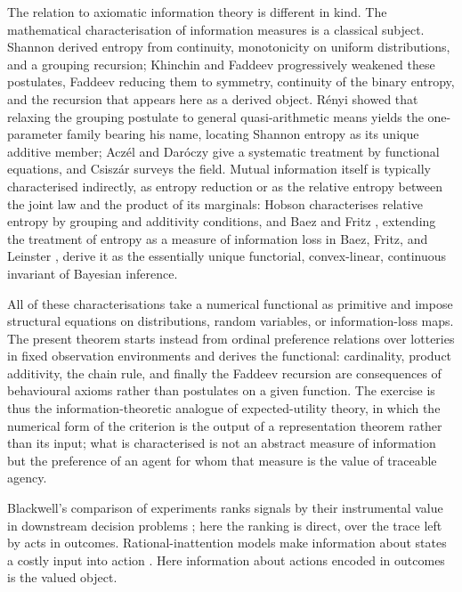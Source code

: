 \documentclass[11pt,a4paper]{article}
\theoremstyle{definition}
\newcommand{\1}{\mathbf 1}
\begin{document}
The relation to axiomatic information theory is different in kind.  The mathematical characterisation of information
measures is a classical subject.  Shannon \cite{Shannon1948} derived entropy from continuity, monotonicity on uniform
distributions, and a grouping recursion; Khinchin \cite{Khinchin1957} and Faddeev \cite{Faddeev1956} progressively
weakened these postulates, Faddeev reducing them to symmetry, continuity of the binary entropy, and the recursion that
appears here as a derived object.  R\'enyi \cite{Renyi1961} showed that relaxing the grouping postulate to general
quasi-arithmetic means yields the one-parameter family bearing his name, locating Shannon entropy as its unique
additive member; Acz\'el and Dar\'oczy \cite{AczelDaroczy1975} give a systematic treatment by functional equations, and
Csisz\'ar \cite{Csiszar2008} surveys the field.  Mutual information itself is typically characterised indirectly, as
entropy reduction or as the relative entropy between the joint law and the product of its marginals: Hobson
\cite{Hobson1969} characterises relative entropy by grouping and additivity conditions, and Baez and Fritz
\cite{BaezFritz2014}, extending the treatment of entropy as a measure of information loss in Baez, Fritz, and Leinster
\cite{BaezFritzLeinster2011}, derive it as the essentially unique functorial, convex-linear, continuous invariant of
Bayesian inference.

All of these characterisations take a numerical functional as primitive and impose structural equations on
distributions, random variables, or information-loss maps.  The present theorem starts instead from ordinal preference
relations over lotteries in fixed observation environments and derives the functional: cardinality, product additivity,
the chain rule, and finally the Faddeev recursion are consequences of behavioural axioms rather than postulates on a
given function.  The exercise is thus the information-theoretic analogue of expected-utility theory, in which the
numerical form of the criterion is the output of a representation theorem rather than its input; what is characterised
is not an abstract measure of information but the preference of an agent for whom that measure is the value of
traceable agency.

Blackwell's comparison of experiments ranks signals by their instrumental value in downstream
decision problems \cite{Blackwell1953}; here the ranking is direct, over the trace left by acts in outcomes.
Rational-inattention models make information about states a costly input into action \cite{Sims2003,MatejkaMcKay2015}.
Here information about actions encoded in outcomes is the valued object.
\end{document}
